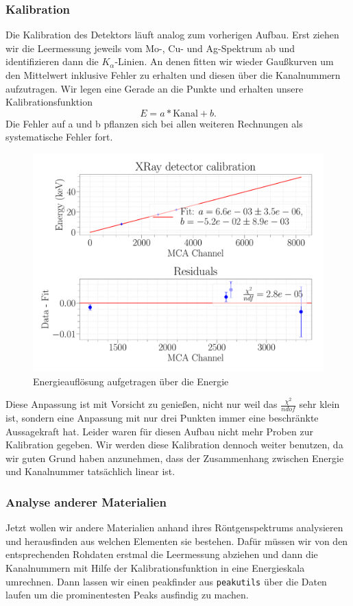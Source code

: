 \documentclass[a4paper,14pt]{article}
\newcommand{\code}[1]{\colorbox{codegray}{\texttt{#1}}}
\begin{document}
\subsubsection{Kalibration}
Die Kalibration des Detektors läuft analog zum vorherigen Aufbau. Erst ziehen wir die Leermessung jeweils vom Mo-, Cu- und Ag-Spektrum ab und identifizieren dann die $K_\alpha$-Linien. An denen fitten wir wieder Gaußkurven um den Mittelwert inklusive Fehler zu erhalten und diesen über die Kanalnummern aufzutragen. Wir legen eine Gerade an die Punkte und erhalten unsere Kalibrationsfunktion
\begin{equation}
	E = a * \mathrm{Kanal} + b.
\end{equation}
Die Fehler auf a und b pflanzen sich bei allen weiteren Rechnungen als systematische Fehler fort.

\begin{figure}[H]
\centering
\includegraphics[scale=0.25]{../Figures/XRay-calibration-fit.pdf}
\caption{Energieauflösung aufgetragen über die Energie}
\label{XRay_calibration}
\end{figure}

Diese Anpassung ist mit Vorsicht zu genießen, nicht nur weil das $\frac{\chi^2}{ndof}$ sehr klein ist, sondern eine Anpassung mit nur drei Punkten immer eine beschränkte Aussagekraft hat. Leider waren für diesen Aufbau nicht mehr Proben zur Kalibration gegeben. Wir werden diese Kalibration dennoch weiter benutzen, da wir guten Grund haben anzunehmen, dass der Zusammenhang zwischen Energie und Kanalnummer tatsächlich linear ist.

\subsubsection{Analyse anderer Materialien}
Jetzt wollen wir andere Materialien  anhand ihres Röntgenspektrums analysieren und herausfinden aus welchen Elementen sie bestehen. Dafür müssen wir von den entsprechenden Rohdaten erstmal die Leermessung abziehen und dann die Kanalnummern mit Hilfe der Kalibrationsfunktion in eine Energieskala umrechnen. Dann lassen wir einen peakfinder aus \code{peakutils} über die Daten laufen um die prominentesten Peaks ausfindig zu machen.
\end{document}
